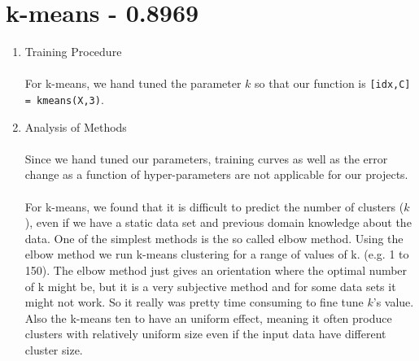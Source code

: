 \documentclass[english]{article}
\begin{document}
\section{k-means - 0.8969}
\begin{enumerate}
\item Training Procedure\\\\
For k-means, we hand tuned the parameter $k$ so that our function is \texttt{[idx,C] = kmeans(X,3)}.\\
\item Analysis of Methods\\\\
Since we hand tuned our parameters, training curves as well as the error change as a function of hyper-parameters are not applicable for our projects.\\\\
For k-means, we found that it is difficult to predict the number of clusters ($k$), even if we have a static data set and previous domain knowledge about the data. One of the simplest methods is the so called elbow method. Using the elbow method we run k-means clustering for a range of values of k. (e.g. 1 to 150). The elbow method just gives an orientation where the optimal number of k might be, but it is a very subjective method and for some data sets it might not work. So it really was pretty time consuming to fine tune $k$'s value. Also the k-means ten to have an uniform effect, meaning it often produce clusters with relatively uniform size even if the input data have different cluster size.


\end{enumerate}
\end{document}
